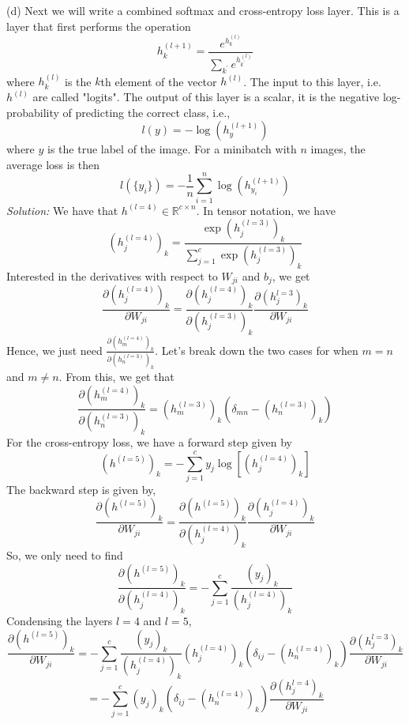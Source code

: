 \documentclass[12pt]{article}
\begin{document}
(d) Next we will write a combined softmax and cross-entropy loss layer. This is a layer that first performs the operation
$$h_{k}^{ (l+1) }    = \frac{ e^{h_{k}^{ (l) } }  }{\sum_{k^{\prime} }  e^{h_{k^{\prime} }^{ (l) }  }}  $$
where $h_{k}^{ (l) } $ is the $k$th element of the vector $h^{(l)}$. The input to this layer, i.e.  $h^{(l)} $ are called "logits".   The output of this layer is a scalar, it is the negative log-probability of predicting the correct class, i.e.,
$$l(y) = -\log (h_{y}^{ (l+1) }  )  $$
where $y$ is the true label of the image. For a minibatch with $n$ images, the average loss is then 
$$l(\{ y_{i} \} )  = -\frac{1}{ n} \sum_{i=1}^{n}  \log (h_{y_{i} }^{ (l+1) }  ) $$
\newline  \newline 
\emph{Solution:}  \newline 
We have that $h^{ (l=4) }  \in \mathbb{R}^{c \times n}$. In tensor notation, we have 
$$ (h^{(l=4)}_{j})_{k}  =  \frac{\exp (h^{(l=3)}_{j})_{k}}{\sum_{j= 1}^{c}   \exp (h^{(l=3)}_{j})_{k}}  $$   
Interested in the derivatives with respect to $W_{ji}$ and $b_{j}$, we get 
$$ \frac{\partial   (h^{(l=4)}_{j})_{k}}{\partial  W_{ji}}  =  \frac{\partial   (h^{(l=4)}_{j})_{k}}{\partial   (h^{(l=3)}_{j})_{k}} \frac{\partial (h^{l=3}_{j})_{k}  }{ \partial W_{ji} }   $$ 
Hence, we just need  $ \frac{\partial   (h^{(l=4)}_{m})_{k}}{\partial   (h^{(l=3)}_{n})_{k}} $. Let's break down the two cases for when $m=n$ and $m\neq n$. From this, we get that 
$$ \frac{\partial   (h^{(l=4)}_{m})_{k}}{\partial   (h^{(l=3)}_{n})_{k}}  =    (h^{(l=3)}_{m})_{k}(\delta_{mn}  -   (h^{(l=3)}_{n})_{k} ) $$
For the cross-entropy loss, we have a forward step given by
$$   (h^{(l=5)} )_{k} = -\sum_{j=1}^{c} y_{j} \log [ (h_{j}^{(l=4)} )_{k} ] $$
The backward step is given by, 
$$ \frac{\partial   (h^{(l=5)})_{k}}{\partial  W_{ji}} =  \frac{\partial   (h^{(l=5)})_{k} }{\partial  (h^{(l=4)}_{j})_{k} }  \frac{\partial   (h^{(l=4)}_{j})_{k}}{\partial  W_{ji}}  $$
So, we only need to find 
$$  \frac{\partial   (h^{(l=5)})_{k} }{\partial  (h^{(l=4)}_{j})_{k} }  = -\sum_{j=1}^{c}  \frac{  (y_{j})_{k}  }{ (h^{(l=4)}_{j})_{k} }   $$ 
Condensing the layers $l=4$ and  $l=5$, 
$$  \frac{\partial   (h^{(l=5)})_{k}}{\partial  W_{ji}}  =  -\sum_{j=1}^{c}  \frac{  (y_{j})_{k}  }{ (h^{(l=4)}_{j})_{k} } (h^{(l=4)}_{j})_{k}(\delta_{ij}  -   (h^{(l=4)}_{n})_{k} ) \frac{\partial (h^{l=3}_{j})_{k}  }{ \partial W_{ji} } $$
$$ =  -\sum_{j=1}^{c}  (y_{j})_{k} (\delta_{ij}  -   (h^{(l=4)}_{n})_{k} ) \frac{\partial (h^{l=4}_{j})_{k}  }{ \partial W_{ji} }   $$
\end{document}
